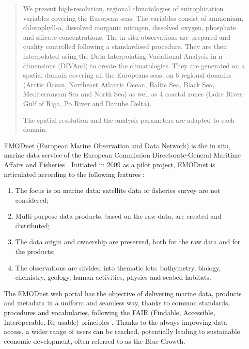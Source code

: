 \documentclass[essd, manuscript]{copernicus}
\begin{document}

\maketitle



\begin{abstract}
We present high-resolution, regional climatologies of eutrophication variables covering the European seas. The variables consist of ammonium, chlorophyll-a, dissolved inorganic nitrogen, dissolved oxygen, phosphate and silicate concentrations. The in situ observations are prepared and quality controlled following a standardised procedure. They are then interpolated using the Data-Interpolating Variational Analysis in n dimensions (DIVAnd) to create the climatologies. They are generated on a spatial domain covering all the Europeans seas, on 6 regional domains (Arctic Ocean, Northeast Atlantic Ocean, Baltic Sea, Black Sea, Mediterranean Sea and North Sea) as well as 4 coastal zones (Loire River, Gulf of Riga, Po River and Danube Delta).

The spatial resolution and the analysis parameters are adapted to each domain.
\end{abstract}


\introduction  %

EMODnet (European Marine Observation and Data Network) is the in situ, marine data service of the European Commission Directorate-General Maritime Affairs and Fisheries \citep{MartinMiguez2019}. Initiated in 2009 as a pilot project, EMODnet is articulated according to the following features \citet{Shepherd2018}: 
\begin{enumerate}
\item The focus is on marine data; satellite data or fisheries survey are not considered; 
\item Multi-purpose data products, based on the raw data, are created and distributed; 
\item The data origin and ownership are preserved, both for the raw data and for the products; 
\item The observations are divided into thematic lots: bathymetry, biology, chemistry, geology, human activities, physics and seabed habitats. 
\end{enumerate} 

The EMODnet web portal has the objective of delivering marine data, products and metadata in a uniform and seamless way, thanks to common standards, procedures and vocabularies, following the
FAIR (Findable, Accessible, Interoperable, Re-usable) principles \citep {Wilkinson2016,Wilkinson2019}. Thanks to the always improving data access, a wider range of users can be reached, potentially leading to sustainable economic development, often referred to as the Blue Growth. 
\end{document}

